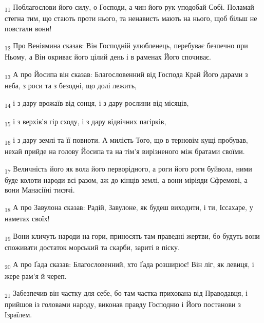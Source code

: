 \begin{tcolorbox}
\textsubscript{11} Поблагослови його силу, о Господи, а чин його рук уподобай Собі. Поламай стегна тим, що стають проти нього, та ненависть мають на нього, щоб більш не повстали вони!
\end{tcolorbox}
\begin{tcolorbox}
\textsubscript{12} Про Веніямина сказав: Він Господній улюбленець, перебуває безпечно при Ньому, а Він окриває його цілий день і в раменах Його спочиває.
\end{tcolorbox}
\begin{tcolorbox}
\textsubscript{13} А про Йосипа він сказав: Благословенний від Господа Край Його дарами з неба, з роси та з безодні, що долі лежить,
\end{tcolorbox}
\begin{tcolorbox}
\textsubscript{14} і з дару врожаїв від сонця, і з дару рослини від місяців,
\end{tcolorbox}
\begin{tcolorbox}
\textsubscript{15} і з верхів'я гір сходу, і з дару відвічних пагірків,
\end{tcolorbox}
\begin{tcolorbox}
\textsubscript{16} і з дару землі та її повноти. А милість Того, що в терновім кущі пробував, нехай прийде на голову Йосипа та на тім'я вирізненого між братами своїми.
\end{tcolorbox}
\begin{tcolorbox}
\textsubscript{17} Величність його як вола його перворідного, а роги його роги буйвола, ними буде колоти народи всі разом, аж до кінців землі, а вони міріяди Єфремові, а вони Манасіїні тисячі.
\end{tcolorbox}
\begin{tcolorbox}
\textsubscript{18} А про Завулона сказав: Радій, Завулоне, як будеш виходити, і ти, Іссахаре, у наметах своїх!
\end{tcolorbox}
\begin{tcolorbox}
\textsubscript{19} Вони кличуть народи на гори, приносять там праведні жертви, бо будуть вони споживати достаток морський та скарби, зариті в піску.
\end{tcolorbox}
\begin{tcolorbox}
\textsubscript{20} А про Ґада сказав: Благословенний, хто Ґада розширює! Він ліг, як левиця, і жере рам'я й череп.
\end{tcolorbox}
\begin{tcolorbox}
\textsubscript{21} Забезпечив він частку для себе, бо там частка прихована від Праводавця, і прийшов із головами народу, виконав правду Господню і Його постанови з Ізраїлем.
\end{tcolorbox}
